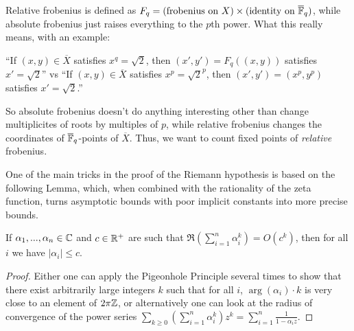 Relative frobenius is defined as $F_q = (\text{frobenius on }X)\times (\text{identity on }\overline{\mathbb{F}}_q)$, while absolute frobenius just raises everything to the $p$th power. What this really means, with an example:

``If $(x,y) \in \overline{X}$ satisfies $x^q = \sqrt{2}$, then  $(x', y') = F_q((x,y))$ satisfies $x' = \sqrt{2}$''
vs
``If $(x,y) \in \overline{X}$ satisfies $x^p = \sqrt{2}^p$, then $(x', y') = (x^p,y^p)$ satisfies $x' = \sqrt{2}$.''

So absolute frobenius doesn't do anything interesting other than change multiplicites of roots by multiples of $p$, while relative frobenius changes the coordinates of $\overline{\mathbb{F}}_q$-points of $\overline{X}$. Thus, we want to count fixed points of \emph{relative} frobenius.

One of the main tricks in the proof of the Riemann hypothesis is based on the following Lemma, which, when combined with the rationality of the zeta function, turns asymptotic bounds with poor implicit constants into more precise bounds.

\begin{lem} If $\alpha_1, ..., \alpha_n \in \mathbb{C}$ and $c \in \mathbb{R}^+$ are such that $\Re(\sum_{i=1}^n \alpha_i^k) = O(c^k)$, then for all $i$ we have $|\alpha_i| \le c$.
\end{lem}
\begin{proof} Either one can apply the Pigeonhole Principle several times to show that there exist arbitrarily large integers $k$ such that for all $i$, $\arg(\alpha_i)\cdot k$ is very close to an element of $2\pi\mathbb{Z}$, or alternatively one can look at the radius of convergence of the power series $\sum_{k \ge 0}(\sum_{i=1}^n \alpha_i^k)z^k = \sum_{i=1}^n \frac{1}{1-\alpha_iz}$.
\end{proof}

